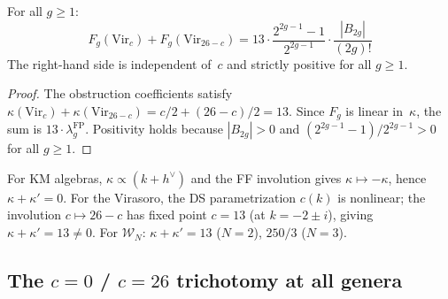 \begin{proposition}\label{prop:vir-complementarity}
For all $g \geq 1$:
\begin{equation}\label{eq:vir-complementarity-allgenera}
F_g(\mathrm{Vir}_c) + F_g(\mathrm{Vir}_{26-c}) = 13 \cdot \frac{2^{2g-1}-1}{2^{2g-1}} \cdot \frac{|B_{2g}|}{(2g)!}
\end{equation}
The right-hand side is independent of~$c$ and strictly positive for all $g \geq 1$.
\end{proposition}

\begin{proof}
The obstruction coefficients satisfy $\kappa(\mathrm{Vir}_c) + \kappa(\mathrm{Vir}_{26-c}) = c/2 + (26-c)/2 = 13$.  Since $F_g$ is linear in~$\kappa$, the sum is $13 \cdot \lambda_g^{\mathrm{FP}}$.  Positivity holds because $|B_{2g}| > 0$ and $(2^{2g-1}-1)/2^{2g-1} > 0$ for all $g \geq 1$.
\end{proof}

\begin{remark}\label{rem:vir-vs-km-complementarity}
For KM algebras, $\kappa \propto (k + h^\vee)$ and the FF involution gives $\kappa \mapsto -\kappa$, hence $\kappa + \kappa' = 0$.  For the Virasoro, the DS parametrization $c(k)$ is nonlinear; the involution $c \mapsto 26 - c$ has fixed point $c = 13$ (at $k = -2 \pm i$), giving $\kappa + \kappa' = 13 \neq 0$.  For $\mathcal{W}_N$: $\kappa + \kappa' = 13$ ($N=2$), $250/3$ ($N=3$).
\end{remark}

\subsection{\texorpdfstring{The $c = 0$ / $c = 26$ trichotomy at all genera}{The c = 0 / c = 26 trichotomy at all genera}}\label{subsec:vir-trichotomy}

